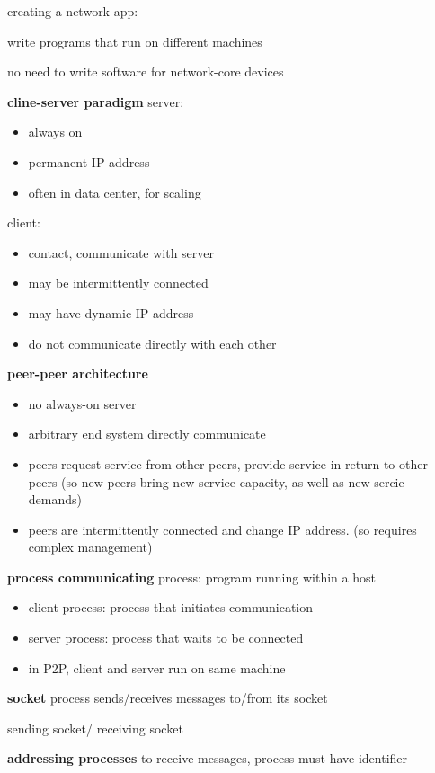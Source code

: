 \documentclass[10pt]{article}
\theoremstyle{break}
\begin{document}
creating a network app: 

write programs that run on different machines 

no need to write software for network-core devices 

\textbf{cline-server paradigm}
server:
\begin{itemize}
    \item always on 
    \item permanent IP address 
    \item often in data center, for scaling
\end{itemize}

client:
\begin{itemize}
    \item contact, communicate with server 
    \item may be intermittently connected 
    \item may have dynamic IP address 
    \item do not communicate directly with each other 
\end{itemize}

\textbf{peer-peer architecture}
\begin{itemize}
    \item no always-on server 
    \item arbitrary end system directly communicate 
    \item peers request service from other peers, provide service in return to other peers (so new peers bring new service capacity, as well as new sercie demands)
    \item peers are intermittently connected and change IP address. (so requires complex management)
\end{itemize}

\textbf{process communicating}
process: program running within a host 
\begin{itemize}
    \item client process: process that initiates communication 
    \item server process: process that waits to be connected 
    \item in P2P, client and server run on same machine
\end{itemize}

\textbf{socket}
process sends/receives messages to/from its socket 

sending socket/ receiving socket

\textbf{addressing processes}
to receive messages, process must have identifier 
\end{document}

